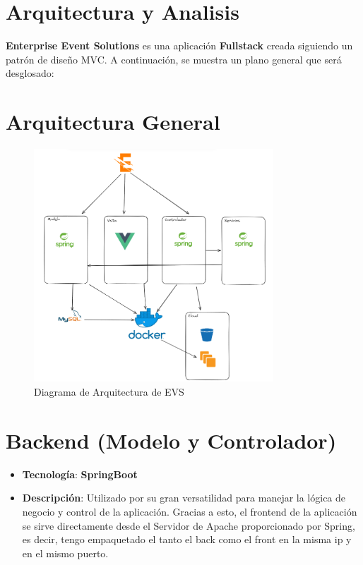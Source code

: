
\section{Arquitectura y Analisis}
\textbf{Enterprise Event Solutions} es una aplicación \textbf{Fullstack} creada siguiendo un patrón de diseño MVC. A continuación, se muestra un plano general
que será desglosado:

\section*{Arquitectura General}
\begin{figure}[h]
    \centering
    \includegraphics[width=0.8\textwidth]{Arquitectura.png} 
    \caption{Diagrama de Arquitectura de EVS}
    \label{fig:mvc_architecture}
\end{figure}
\newpage

\section*{Backend (Modelo y Controlador)}

\begin{itemize}
    \item \textbf{Tecnología}: \textbf{SpringBoot}
    \item \textbf{Descripción}: Utilizado por su gran versatilidad para manejar la lógica de negocio y control de la aplicación. Gracias a esto, el frontend
    de la aplicación se sirve directamente desde el Servidor de Apache proporcionado por Spring, es decir, tengo empaquetado el tanto el back como el front en la misma ip
    y en el mismo puerto.
\end{itemize}

